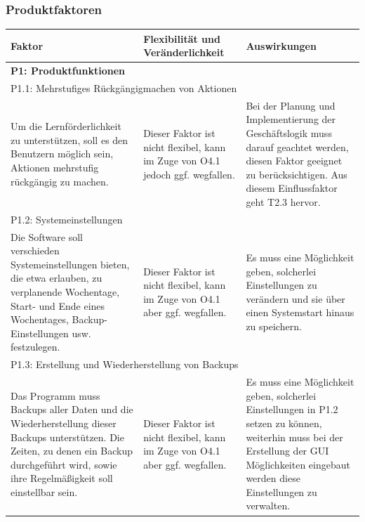\documentclass[fontsize=12pt,paper=a4,twoside]{scrartcl}
\begin{document}
\subsubsection{Produktfaktoren}
\begin{tabularx}{\textwidth}{|X|X|X|}
\hline
\textbf{Faktor} & \textbf{Flexibilität und Veränderlichkeit} & \textbf{Auswirkungen}\\\hline
\hline
\multicolumn{3}{|l|}{\textbf{P1: Produktfunktionen}}\\\hline
\multicolumn{3}{|l|}{P1.1: Mehrstufiges Rückgängigmachen von Aktionen}\\\hline
Um die Lernförderlichkeit zu unterstützen, soll es den Benutzern möglich sein, Aktionen mehrstufig rückgängig zu machen. & Dieser Faktor ist nicht flexibel, kann im Zuge von O4.1 jedoch ggf. wegfallen. & Bei der Planung und Implementierung der Geschäftslogik muss darauf geachtet werden, diesen Faktor geeignet zu berücksichtigen. Aus diesem Einflussfaktor geht T2.3 hervor.
\\\hline
\multicolumn{3}{|l|}{P1.2: Systemeinstellungen}\\\hline
Die Software soll verschieden Systemeinstellungen bieten, die etwa erlauben, zu verplanende Wochentage, Start- und Ende eines Wochentages, Backup-Einstellungen usw. festzulegen. & Dieser Faktor ist nicht flexibel, kann im Zuge von O4.1 aber ggf. wegfallen. & Es muss eine Möglichkeit geben, solcherlei Einstellungen zu verändern und sie über einen Systemstart hinaus zu speichern.\\\hline
\multicolumn{3}{|l|}{P1.3: Erstellung und Wiederherstellung von Backups}\\\hline
Das Programm muss Backups aller Daten und die Wiederherstellung dieser Backups unterstützen. Die Zeiten, zu denen ein Backup durchgeführt wird, sowie ihre Regelmäßigkeit soll einstellbar sein. & Dieser Faktor ist nicht flexibel, kann im Zuge von O4.1 aber ggf. wegfallen. & Es muss eine Möglichkeit geben, solcherlei Einstellungen in P1.2 setzen zu können, weiterhin muss bei der Erstellung der GUI Möglichkeiten eingebaut werden diese Einstellungen zu verwalten.\\\hline
\end{tabularx} \newpage
\end{document}
